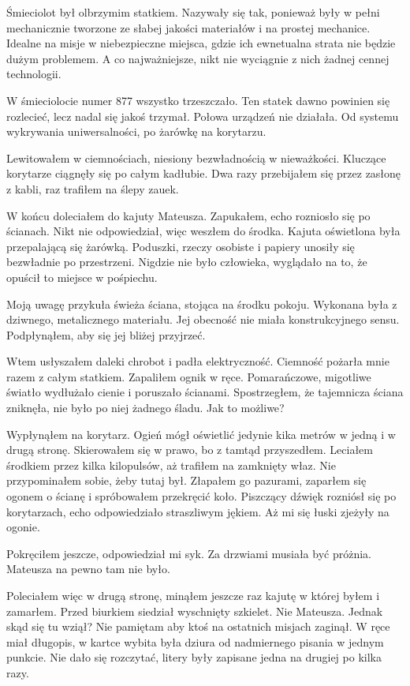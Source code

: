 \divider{}

Śmieciolot był olbrzymim statkiem. 
Nazywały się tak, ponieważ były w pełni mechanicznie tworzone ze słabej jakości materiałów i na prostej mechanice.
Idealne na misje w niebezpieczne miejsca, gdzie ich ewnetualna strata nie będzie dużym problemem. 
A co najważniejsze, nikt nie wyciągnie z nich żadnej cennej technologii.

W śmieciolocie numer 877 wszystko trzeszczało. 
Ten statek dawno powinien się rozlecieć, lecz nadal się jakoś trzymał.
Połowa urządzeń nie działała. Od systemu wykrywania uniwersalności, po żarówkę na korytarzu.

Lewitowałem w ciemnościach, niesiony bezwładnością w nieważkości.
Kluczące korytarze ciągnęły się po całym kadłubie.
Dwa razy przebijałem się przez zasłonę z kabli, raz trafiłem na ślepy zauek.

W końcu doleciałem do kajuty Mateusza. 
Zapukałem, echo rozniosło się po ścianach.
Nikt nie odpowiedział, więc weszłem do środka.
Kajuta oświetlona była przepalającą się żarówką.
Poduszki, rzeczy osobiste i papiery unosiły się bezwładnie po przestrzeni.
Nigdzie nie było człowieka, wyglądało na to, że opuścił to miejsce w pośpiechu.

Moją uwagę przykuła świeża ściana, stojąca na środku pokoju.
Wykonana była z dziwnego, metalicznego materiału.
Jej obecność nie miała konstrukcyjnego sensu.
Podpłynąłem, aby się jej bliżej przyjrzeć.

Wtem usłyszałem daleki chrobot i padła elektryczność.
Ciemność pożarła mnie razem z całym statkiem.
Zapaliłem ognik w ręce. Pomarańczowe, migotliwe światło wydłużało cienie i poruszało ścianami.
Spostrzegłem, że tajemnicza ściana zniknęła, nie było po niej żadnego śladu.
Jak to możliwe?

Wypłynąłem na korytarz.
Ogień mógł oświetlić jedynie kika metrów w jedną i w drugą stronę.
Skierowałem się w prawo, bo z tamtąd przyszedłem.
Leciałem środkiem przez kilka kilopulsów, aż trafiłem na zamknięty właz. 
Nie przypominałem sobie, żeby tutaj był. 
Złapałem go pazurami, zaparłem się ogonem o ścianę i spróbowałem przekręcić koło. 
Piszczący dźwięk rozniósł się po korytarzach, echo odpowiedziało straszliwym jękiem. 
Aż mi się łuski zjeżyły na ogonie.

Pokręciłem jeszcze, odpowiedział mi syk. 
Za drzwiami musiała być próżnia.
Mateusza na pewno tam nie było.

Poleciałem więc w drugą stronę, minąłem jeszcze raz kajutę w której byłem i zamarłem.
Przed biurkiem siedział wyschnięty szkielet. Nie Mateusza.
Jednak skąd się tu wziął? Nie pamiętam aby ktoś na ostatnich misjach zaginął. 
W ręce miał długopis, w kartce wybita była dziura od nadmiernego pisania w jednym punkcie. 
Nie dało się rozczytać, litery były zapisane jedna na drugiej po kilka razy.

